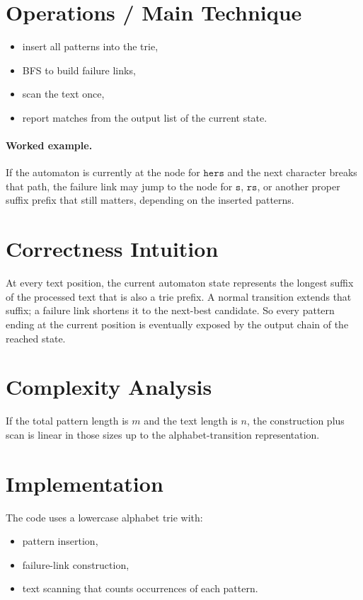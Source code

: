 \section*{Operations / Main Technique}

\begin{itemize}
  \item insert all patterns into the trie,
  \item BFS to build failure links,
  \item scan the text once,
  \item report matches from the output list of the current state.
\end{itemize}

\paragraph{Worked example.}
If the automaton is currently at the node for \(\texttt{hers}\) and the next character breaks that path, the failure
link may jump to the node for \(\texttt{s}\), \(\texttt{rs}\), or another proper suffix prefix that still matters,
depending on the inserted patterns.

\section*{Correctness Intuition}

At every text position, the current automaton state represents the longest suffix of the processed text that is also a
trie prefix. A normal transition extends that suffix; a failure link shortens it to the next-best candidate. So every
pattern ending at the current position is eventually exposed by the output chain of the reached state.

\section*{Complexity Analysis}

If the total pattern length is \(m\) and the text length is \(n\), the construction plus scan is linear in those sizes
up to the alphabet-transition representation.

\section*{Implementation}

The code uses a lowercase alphabet trie with:

\begin{itemize}
  \item pattern insertion,
  \item failure-link construction,
  \item text scanning that counts occurrences of each pattern.
\end{itemize}

